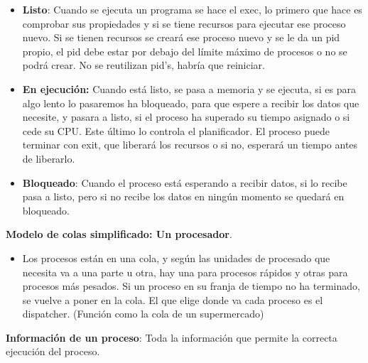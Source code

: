 \documentclass[12pt, twoside, openright]{report} %
\begin{document}
  \begin{itemize}
  \item \textbf{Listo}: Cuando se ejecuta un programa se hace el exec, lo
    primero que hace es comprobar sus propiedades y si se tiene recursos
    para ejecutar ese proceso nuevo. Si se tienen recursos se creará ese
    proceso nuevo y se le da un pid propio, el pid debe estar por debajo
    del límite máximo de procesos o no se podrá crear. No se reutilizan
    pid's, habría que reiniciar.
    
  \item \textbf{En ejecución:} Cuando está listo, se pasa a memoria y se
    ejecuta, si es para algo lento lo pasaremos ha bloqueado, para que
    espere a recibir los datos que necesite, y pasara a listo, si el
    proceso ha superado su tiempo asignado o si cede su CPU. Este último
    lo controla el planificador. El proceso puede terminar con exit, que
    liberará los recursos o si no, esperará un tiempo antes de
    liberarlo.
    
  \item \textbf{Bloqueado}: Cuando el proceso está esperando a recibir
    datos, si lo recibe pasa a listo, pero si no recibe los datos en
    ningún momento se quedará en bloqueado.
    
  \end{itemize}
\textbf{Modelo de colas simplificado: Un procesador}.
  

  \begin{itemize}
  \item Los procesos están en una cola, y según las unidades de procesado
    que necesita va a una parte u otra, hay una para procesos rápidos y
    otras para procesos más pesados. Si un proceso en su franja de
    tiempo no ha terminado, se vuelve a poner en la cola. El que elige
    donde va cada proceso es el dispatcher. (Función como la cola de un
    supermercado)
    
  \end{itemize}
  \pagebreak
\textbf{Información de un proceso}: Toda la información que permite la
  correcta ejecución del proceso.
  
\end{document}
